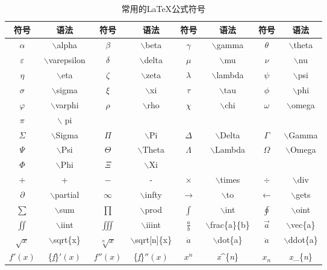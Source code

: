 \documentclass[11pt]{article}
\let\Oldlatex\LaTeX
\renewcommand{\LaTeX}{\textrm{\Oldlatex}}
\begin{document}
    \begin{table}[H]
    	\centering
    	\caption{常用的\LaTeX 公式符号}
    	\setlength{\tabcolsep}{10pt}
    	\begin{tabular}{cc|cc|cc|cc}
    		\toprule
    		\textbf{符号} & \textbf{语法} & \textbf{符号} & \textbf{语法} & \textbf{符号} & \textbf{语法} & \textbf{符号} & \textbf{语法} \\
    		\midrule
    		$\alpha$ & $\backslash$alpha & $\beta$ & $\backslash$beta & $\gamma$ & $\backslash$gamma & $\theta$ & $\backslash$theta \\
    		$\varepsilon$ & $\backslash$varepsilon & $\delta$ & $\backslash$delta & $\mu$ & $\backslash$mu & $\nu$ & $\backslash$nu \\
    		$\eta$ & $\backslash$eta & $\zeta$ & $\backslash$zeta & $\lambda$ & $\backslash$lambda & $\psi$ & $\backslash$psi \\
    		$\sigma$ & $\backslash$sigma & $\xi$ & $\backslash$xi & $\tau$ & $\backslash$tau & $\phi$ & $\backslash$phi \\
    		$\varphi$ & $\backslash$varphi & $\rho$ & $\backslash$rho & $\chi$ & $\backslash$chi & $\omega$ & $\backslash$omega \\
    		$\pi$ & $\backslash$ pi &  &  &  &  &  &  \\
    		\midrule
    		$\Sigma$ & $\backslash$Sigma & $\Pi$ & $\backslash$Pi & $\Delta$ & $\backslash$Delta & $\Gamma$ & $\backslash$Gamma \\
    		$\Psi$ & $\backslash$Psi & $\Theta$ & $\backslash$Theta & $\Lambda$ & $\backslash$Lambda & $\Omega$ & $\backslash$Omega \\
    		$\Phi$ & $\backslash$Phi & $\Xi$ & $\backslash$Xi &  &  &  &  \\
    		\midrule
    		$+$ & + & $-$ & - & $\times$ & $\backslash$times & $\div$ & $\backslash$div \\
    		$\partial$ & $\backslash$partial & $\infty$ & $\backslash$infty & $\to$ & $\backslash$to & $\gets$ & $\backslash$gets \\	
    		\midrule
    		$\sum$ & $\backslash$sum & $\prod$ & $\backslash$prod & $\int$ & $\backslash$int & $\oint$ & $\backslash$oint \\
    		$\iint$ & $\backslash$iint & $\iiint$ & $\backslash$iiint & $\frac{a}{b}$ & $\backslash$frac\{a\}\{b\} & $\vec{a}$ & $\backslash$vec\{a\} \\
    		$\sqrt{x}$ & $\backslash$sqrt\{x\} & $\sqrt[n]{x}$ & $\backslash$sqrt[n]\{x\} & $\dot{a}$ & $\backslash$dot\{a\} & $\ddot{a}$ & $\backslash$ddot\{a\} \\
    		${f}'(x)$ & \{\underline{\textit{f}}\}$'(x)$ & ${f}''(x)$ & \{\underline{\textit{f}}\}$''(x)$ & $x^{n}$ & \textit{x}\^{}\{\textit{n}\} & $x_{n}$ & \textit{x}\_\{\textit{n}\} \\
    		\bottomrule
    	\end{tabular}
    	\label{table5}
    \end{table}
    
\end{document}
